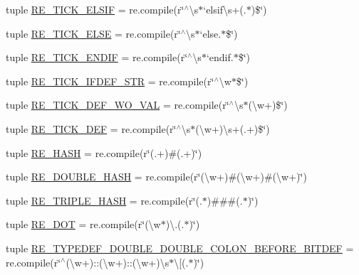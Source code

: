 \begin{DoxyCompactItemize}
tuple \hyperlink{namespacesrc_1_1regex_ac813c5c2fd6c17cdfe5686ab1eeb3640}{R\-E\-\_\-\-T\-I\-C\-K\-\_\-\-E\-L\-S\-I\-F} = re.\-compile(r\char`\"{}$^\wedge$\textbackslash{}s$\ast$`elsif\textbackslash{}s+(.$\ast$)\$\char`\"{})
\item 
tuple \hyperlink{namespacesrc_1_1regex_a56d5f3fcc341b5cd282452c6cb155826}{R\-E\-\_\-\-T\-I\-C\-K\-\_\-\-E\-L\-S\-E} = re.\-compile(r\char`\"{}$^\wedge$\textbackslash{}s$\ast$`else.$\ast$\$\char`\"{})
\item 
tuple \hyperlink{namespacesrc_1_1regex_a3adb11d0fc5bf8a49bc769375563bbfd}{R\-E\-\_\-\-T\-I\-C\-K\-\_\-\-E\-N\-D\-I\-F} = re.\-compile(r\char`\"{}$^\wedge$\textbackslash{}s$\ast$`endif.$\ast$\$\char`\"{})
\item 
tuple \hyperlink{namespacesrc_1_1regex_a615e332e4311b59420bcb3aeab332527}{R\-E\-\_\-\-T\-I\-C\-K\-\_\-\-I\-F\-D\-E\-F\-\_\-\-S\-T\-R} = re.\-compile(r\char`\"{}$^\wedge$\textbackslash{}w$\ast$\$\char`\"{})
\item 
tuple \hyperlink{namespacesrc_1_1regex_a300290019acc926fd55fd4406ae113de}{R\-E\-\_\-\-T\-I\-C\-K\-\_\-\-D\-E\-F\-\_\-\-W\-O\-\_\-\-V\-A\-L} = re.\-compile(r\char`\"{}$^\wedge$\textbackslash{}s$\ast$(\textbackslash{}w+)\$\char`\"{})
\item 
tuple \hyperlink{namespacesrc_1_1regex_a6023cd5b32d4c70590c421f23edfedbc}{R\-E\-\_\-\-T\-I\-C\-K\-\_\-\-D\-E\-F} = re.\-compile(r\char`\"{}$^\wedge$\textbackslash{}s$\ast$(\textbackslash{}w+)\textbackslash{}s+(.+)\$\char`\"{})
\item 
tuple \hyperlink{namespacesrc_1_1regex_acd48c29153f9fd47cbc3794c95937797}{R\-E\-\_\-\-H\-A\-S\-H} = re.\-compile(r\char`\"{}(.+)\#(.+)\char`\"{})
\item 
tuple \hyperlink{namespacesrc_1_1regex_a531e561bc03101f2f529c3542959949f}{R\-E\-\_\-\-D\-O\-U\-B\-L\-E\-\_\-\-H\-A\-S\-H} = re.\-compile(r\char`\"{}(\textbackslash{}w+)\#(\textbackslash{}w+)\#(\textbackslash{}w+)\char`\"{})
\item 
tuple \hyperlink{namespacesrc_1_1regex_a3087ab0759ee08c52d5d2245dc444e44}{R\-E\-\_\-\-T\-R\-I\-P\-L\-E\-\_\-\-H\-A\-S\-H} = re.\-compile(r\char`\"{}(.$\ast$)\#\#\#(.$\ast$)\char`\"{})
\item 
tuple \hyperlink{namespacesrc_1_1regex_aade96c8d59bf34d132098ae30a6f62dd}{R\-E\-\_\-\-D\-O\-T} = re.\-compile(r\char`\"{}(\textbackslash{}w$\ast$)\textbackslash{}.(.$\ast$)\char`\"{})
\item 
tuple \hyperlink{namespacesrc_1_1regex_afb9128166bea761d4a0cf80b9d672e05}{R\-E\-\_\-\-T\-Y\-P\-E\-D\-E\-F\-\_\-\-D\-O\-U\-B\-L\-E\-\_\-\-D\-O\-U\-B\-L\-E\-\_\-\-C\-O\-L\-O\-N\-\_\-\-B\-E\-F\-O\-R\-E\-\_\-\-B\-I\-T\-D\-E\-F} = re.\-compile(r\char`\"{}$^\wedge$(\textbackslash{}w+)\-::(\textbackslash{}w+)\-::(\textbackslash{}w+)\textbackslash{}s$\ast$\textbackslash{}\mbox{[}(.$\ast$)\char`\"{})

\end{DoxyCompactItemize}
